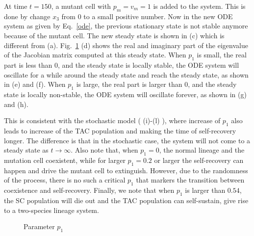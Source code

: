 \documentclass[12pt]{article}
\begin{document}
At time $t=150$, a mutant cell with $p_m=v_m=1$ is added to the system. 
This is done by change $x_3$ from 0 to a small positive number.
Now in the new ODE system as given by Eq.~\eqref{ode}, 
the previous stationary state is not stable anymore because 
of the mutant cell. The new steady state is shown in (c) 
which is different from (a).
Fig.~\ref{afig_stab_p1} (d) shows the real and imaginary part
of the eigenvalue of the Jacobian matrix computed at this 
steady state. When $p_1$ is small,
the real part is less than 0, and
the steady state is locally stable,   
the ODE system will oscillate for a while around the steady
state and reach the steady state, as shown in (e) and (f).
When $p_1$ is large,
the real part is larger than 0, and
the steady state is locally non-stable,   
the ODE system will oscillate forever, as shown in (g) and (h).

This is consistent with the stochastic
model ( (i)-(l) ), where increase of $p_1$ also leads to increase of the TAC
population and making the time of self-recovery longer. 
The difference is that in the stochastic case, the 
system will not come to a steady state as $t\rightarrow \infty$.
Also note that, when $p_1=0$, the normal lineage and 
the mutation cell coexistent, while for larger $p_1=0.2$ or larger
the self-recovery can happen and drive the mutant cell to 
extinguish. However, due to the randomness of the process, 
there is no such a critical $p_1$ that markers the 
transition between coexistence and self-recovery.
Finally, we note that when $p_1$ is larger than $0.54$,
the SC population will die out and the TAC population
can self-sustain, give rise to a two-species lineage system.

\begin{figure}
\centering
{}
\caption{Parameter $p_1$}
\label{afig_stab_p1}
\end{figure}
\end{document}
